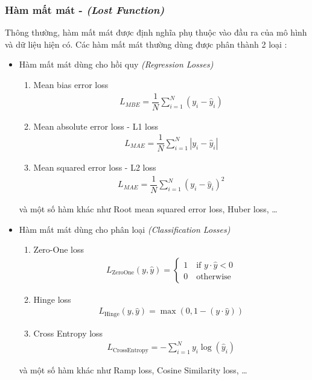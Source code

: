 \subsubsection{Hàm mất mát - \textit{(Lost Function)}}
Thông thường, hàm mất mát được định nghĩa phụ thuộc vào đầu ra của mô hình và dữ liệu hiện có. Các hàm mất mát thường dùng được phân thành 2 loại \cite{ciampiconi2023survey}:
\begin{itemize}
    \item Hàm mất mát dùng cho hồi quy \textit{(Regression Losses)}
          \begin{enumerate}
              \item Mean bias error loss
                    \begin{align}
                        L_{MBE}=\dfrac{1}{N}\sum_{i=1}^N\left(y_i-\hat y_i\right)
                    \end{align}
              \item Mean absolute error loss - L1 loss
                    \begin{align}
                        L_{MAE}=\dfrac{1}{N}\sum_{i=1}^N\left|y_i-\hat y_i\right|
                    \end{align}
              \item Mean squared error loss - L2 loss
                    \begin{align}
                        L_{MAE}=\dfrac{1}{N}\sum_{i=1}^N\left(y_i-\hat y_i\right)^2
                    \end{align}
          \end{enumerate}
          và một số hàm khác như Root mean squared error loss, Huber loss, \dots
    \item Hàm mất mát dùng cho phân loại \textit{(Classification Losses)}
          \begin{enumerate}
              \item Zero-One loss
                    \begin{align}
                        L_\text{ZeroOne}(y,\hat y)=
                        \begin{cases}
                            1\quad\text{if }y\cdot\hat y<0 \\
                            0\quad\text{otherwise}
                        \end{cases}
                    \end{align}
              \item Hinge loss
                    \begin{align}
                        L_\text{Hinge}(y,\hat y)=\max(0,1-(y\cdot\hat y))
                    \end{align}
              \item Cross Entropy loss
                    \begin{align}
                        L_\text{CrossEntropy}=-\sum_{i=1}^N y_i\log(\hat y_i)
                    \end{align}
          \end{enumerate}
          và một số hàm khác như Ramp loss, Cosine Similarity loss, \dots
\end{itemize}

